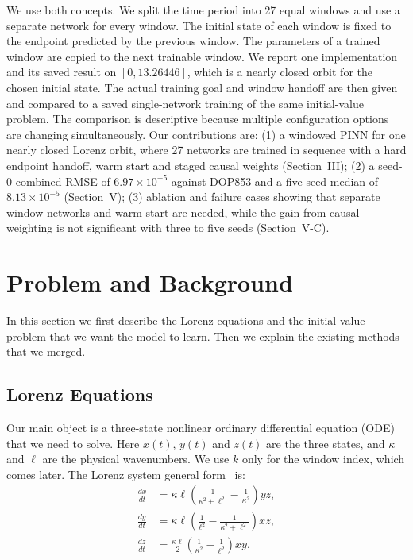 \documentclass[conference]{IEEEtran}
\begin{document}
We use both concepts. We split the time period into 27 equal windows and use a separate network for every window. The initial state of each window is fixed to the endpoint predicted by the previous window. The parameters of a trained window are copied to the next trainable window. We report one implementation and its saved result on $[0,13.26446]$, which is a nearly closed orbit for the chosen initial state. The actual training goal and window handoff are then given and compared to a saved single-network training of the same initial-value problem. The comparison is descriptive because multiple configuration options are changing simultaneously. Our contributions are: (1) a windowed PINN for one nearly closed Lorenz orbit, where 27 networks are trained in sequence with a hard endpoint handoff, warm start and staged causal weights (Section~III); (2) a seed-0 combined RMSE of $6.97\times10^{-5}$ against DOP853 and a five-seed median of $8.13\times10^{-5}$ (Section~V); (3) ablation and failure cases showing that separate window networks and warm start are needed, while the gain from causal weighting is not significant with three to five seeds (Section~V-C).



\section{Problem and Background}
In this section we first describe the Lorenz equations and the initial value problem that we want the model to learn. Then we explain the existing methods that we merged.

\subsection{Lorenz Equations}
Our main object is a three-state nonlinear ordinary differential equation (ODE) that we need to solve. Here $x(t)$, $y(t)$ and $z(t)$ are the three states, and $\kappa$ and $\ell$ are the physical wavenumbers. We use $k$ only for the window index, which comes later. The Lorenz system general form~\cite{lorenz1960} is:
\begin{equation}
\begin{aligned}
\frac{dx}{dt}
  &= \kappa\ell
     \left(\frac{1}{\kappa^2+\ell^2}
           -\frac{1}{\kappa^2}\right)yz,\\
\frac{dy}{dt}
  &= \kappa\ell
     \left(\frac{1}{\ell^2}
           -\frac{1}{\kappa^2+\ell^2}\right)xz,\\
\frac{dz}{dt}
  &= \frac{\kappa\ell}{2}
     \left(\frac{1}{\kappa^2}
           -\frac{1}{\ell^2}\right)xy.
\end{aligned}
\label{eq:lorenz1960}
\end{equation}
\end{document}
